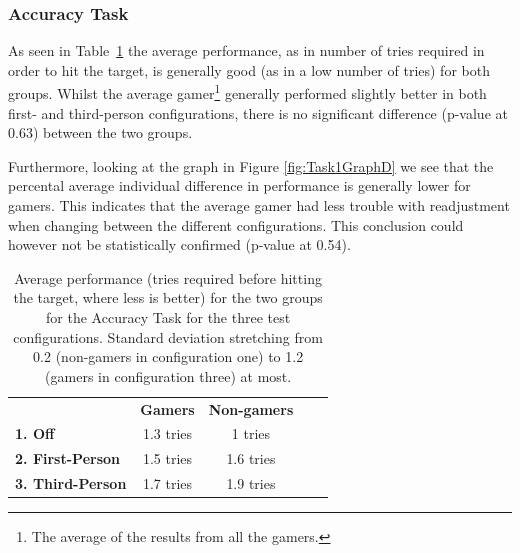 \documentclass[runningheads,a4paper,oribibl]{llncs}
\begin{document}


\subsubsection{Accuracy Task}
As seen in Table~\ref{tab:Task1GraphP} the average performance, as in number of tries required in order to hit the target, is generally good (as in a low number of tries) for both groups. Whilst the average gamer\footnote{The average of the results from all the gamers.} generally performed slightly better in both first- and third-person configurations, there is no significant difference (p-value at 0.63) between the two groups.

Furthermore, looking at the graph in Figure \ref{fig:Task1GraphD} we see that the percental average individual difference in performance is generally lower for gamers. This indicates that the average gamer had less trouble with readjustment when changing between the different configurations. This conclusion could however not be statistically confirmed (p-value at 0.54).


\begin{table}[]
\centering

\setlength{\tabcolsep}{1em}
\def\arraystretch{1.8}
\begin{tabular}{l|c|cll}
                      & {\textbf{Gamers}} & {\textbf{Non-gamers}} &  &  \\ \cline{1-3}
\textbf{1. Off}          & 1.3 tries                                   & 1 tries                                          &  &  \\ \cline{1-3}
\textbf{2. First-Person} & 1.5 tries                                    & 1.6 tries                                        &  &  \\ \cline{1-3}
\textbf{3. Third-Person} & 1.7 tries                                    & 1.9 tries                                        &  & 
\end{tabular}
\caption{Average performance (tries required before hitting the target, where less is better) for the two groups for the Accuracy Task for the three test configurations. Standard deviation stretching from 0.2 (non-gamers in configuration one) to 1.2 (gamers in configuration three) at most.}
\label{tab:Task1GraphP}
\end{table}
\end{document}
